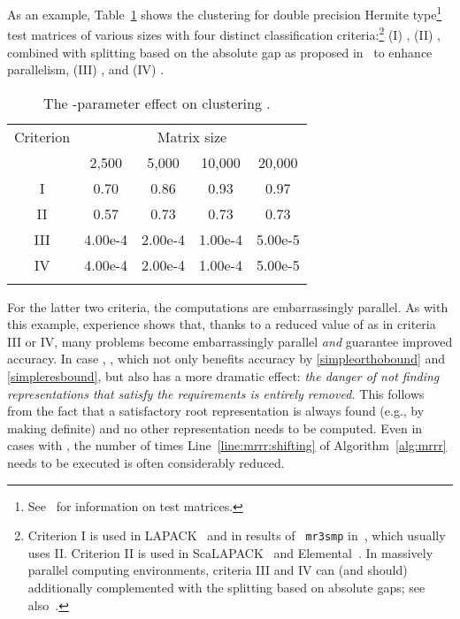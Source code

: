\documentclass[final]{siamltex}
\begin{document}
 As an example, Table~\ref{tab:clustering}
 shows the clustering for double precision Hermite 
 type\footnote{See~\cite{Marques:2008} for information on test matrices.} test matrices of
 various sizes with four distinct classification criteria:\footnote{Criterion I is used in LAPACK~\cite{DesignMRRR} and in results of {\tt
    mr3smp} in~\cite{mr3smp}, which usually uses II. Criterion II is used in
  ScaLAPACK~\cite{Vomel:2010:ScaLAPACKsMRRR} and
  Elemental~\cite{EleMRRR}. In massively parallel computing environments,
  criteria III and IV can (and should) additionally complemented with the
  splitting based on absolute gaps; see also~\cite{mixedtr}.} 
(I) , (II) , combined with splitting based on
the absolute gap as proposed in~\cite{VoemelRefinedTree2007tr} to enhance
parallelism, (III) , and (IV) .
\begin{table}[htb]
\begin{center}
\small
\begin{tabular}{c@{\quad\quad\quad}cccc}
\toprule
Criterion &   \multicolumn{4}{c}{Matrix size} \\
               & 2{,}500 & 5{,}000 & 10{,}000 & 20{,}000 \\
\midrule
I  &  0.70  &         0.86   &  0.93  & 0.97 \\
II &  0.57   &        0.73   &  0.73  & 0.73 \\
III &  4.00e-4  &   2.00e-4   &  1.00e-4  & 5.00e-5  \\
IV &  4.00e-4  &   2.00e-4   &  1.00e-4  & 5.00e-5 \\
\bottomrule\noalign{\smallskip}
\end{tabular} 
\end{center}
\caption{The -parameter effect on clustering .  
}
\label{tab:clustering}
\end{table}
For the latter two criteria, the computations are embarrassingly parallel.
As with this example, experience shows that, thanks to a reduced value of
 as in criteria III or IV, many problems 
become embarrassingly parallel {\em and} guarantee improved accuracy. 
In case , , which not only benefits accuracy by
\eqref{simpleorthobound} and \eqref{simpleresbound}, but also has a 
more dramatic effect: {\it the danger of 
not finding representations that satisfy the requirements is entirely
removed.} This follows from the fact that a satisfactory root representation is 
always found (e.g., by making  definite) and no other
representation needs to be computed. 
Even in cases with , the
number of times Line~\ref{line:mrrr:shifting} of Algorithm~\ref{alg:mrrr}
needs to be executed is often considerably reduced. 
\end{document}
